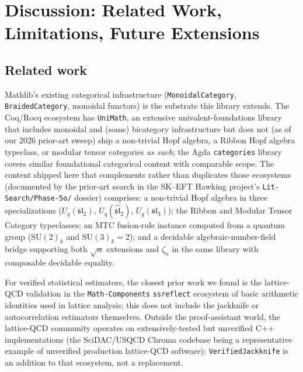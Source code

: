 \documentclass[11pt]{article}
\begin{document}

\section{Discussion: Related Work, Limitations, Future Extensions}
\label{sec:discussion}

\subsection{Related work}

Mathlib's existing categorical infrastructure
(\texttt{MonoidalCategory}, \texttt{BraidedCategory}, monoidal
functors) is the substrate this library extends. The Coq/Rocq
ecosystem has \texttt{UniMath}, an extensive univalent-foundations
library that includes monoidal and (some) bicategory infrastructure
but does not (as of our 2026 prior-art sweep) ship a non-trivial
Hopf algebra, a Ribbon Hopf algebra typeclass, or modular tensor
categories \emph{as such}; the Agda \texttt{categories} library
covers similar foundational categorical content with comparable
scope. The content shipped here that complements rather than
duplicates those ecosystems (documented by the prior-art search
in the SK--EFT Hawking project's \texttt{Lit-Search/Phase-5o/}
dossier) comprises: a non-trivial Hopf algebra in three
specializations ($U_q(\mathfrak{sl}_2)$,
$U_q(\widehat{\mathfrak{sl}}_2)$, $U_q(\mathfrak{sl}_3)$); the
Ribbon and Modular Tensor Category typeclasses; an MTC fusion-rule
instance computed from a quantum group ($\mathrm{SU}(2)_k$ and
$\mathrm{SU}(3)_k=2$); and a decidable algebraic-number-field bridge
supporting both $\sqrt{n}$ extensions and $\zeta_n$ in the same
library with composable decidable equality.

For verified statistical estimators, the closest prior work we
found is the lattice-QCD validation in the
\texttt{Math-Components} \texttt{ssreflect} ecosystem of basic
arithmetic identities used in lattice analysis; this does not
include the jackknife or autocorrelation estimators themselves.
Outside the proof-assistant world, the lattice-QCD community
operates on extensively-tested but unverified C++ implementations
(the SciDAC/USQCD Chroma codebase being a representative example
of unverified production lattice-QCD software);
\texttt{VerifiedJackknife} is an addition to that ecosystem, not
a replacement.
\end{document}
